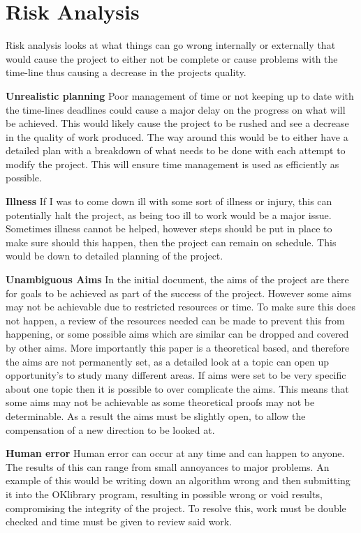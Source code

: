 \documentclass[11pt,a4paper]{report}
\begin{document}
\section{Risk Analysis}
Risk analysis looks at what things can go wrong internally or externally that would cause the project to either not be complete or cause problems with the time-line thus causing a decrease in the projects quality.


\textbf{Unrealistic planning}
Poor management of time or not keeping up to date with the time-lines deadlines could cause a major delay on the progress on what will be achieved. This would likely cause the project to be rushed and see a decrease in the quality of work produced. The way around this would be to either have a detailed plan with a breakdown of what needs to be done with each attempt to modify the project. This will ensure time management is used as efficiently as possible.

\textbf{Illness}
If I was to come down ill with some sort of illness or injury, this can potentially halt the project, as being too ill to work would be a major issue. Sometimes illness cannot be helped, however steps should be put in place to make sure should this happen, then the project can remain on schedule. This would be down to detailed planning of the project.


\textbf{Unambiguous Aims}
In the initial document, the aims of the project are there for goals to be achieved as part of the success of the project. However some aims may not be achievable due to restricted resources or time.
To make sure this does not happen, a review of the resources needed can be made to prevent this from happening, or some possible aims which are similar can be dropped and covered by other aims. More importantly this paper is a theoretical based, and therefore the aims are not permanently set, as a detailed look at a topic can open up opportunity's to study many different areas. If aims were set to be very specific about one topic then it is possible to over complicate the aims. This means that some aims may not be achievable as some theoretical proofs may not be determinable. As a result the aims must be slightly open, to allow the compensation of a new direction to be looked at.


\textbf{Human error}
Human error can occur at any time and can happen to anyone. The results of this can range from small annoyances to major problems. An example of this would be writing down an algorithm wrong and then submitting it into the OKlibrary program, resulting in possible wrong or void results, compromising the integrity of the project. To resolve this, work must be double checked and time must be given to review said work.
\end{document}
